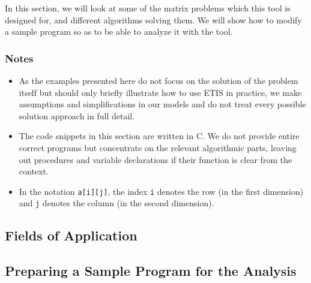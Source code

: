 In this section, we will look at some of the matrix problems which this tool is designed for, and different algorithms solving them. We will show how to modify a sample program so as to be able to analyze it with the tool.

\subsubsection*{Notes}
\begin{itemize}
\item As the examples presented here do not focus on the solution of the problem itself but should only briefly illustrate how to use ETIS in practice, we make assumptions and simplifications in our models and do not treat every possible solution approach in full detail.

\item The code snippets in this section are written in C. We do not provide entire correct programs but concentrate on the relevant algorithmic parts, leaving out procedures and variable declarations if their function is clear from the context.

\item In the notation \texttt{a[i][j]}, the index \texttt{i} denotes the row (in the first dimension) and \texttt{j} denotes the column (in the second dimension).
\end{itemize}


\subsection{Fields of Application}


\subsection{Preparing a Sample Program for the Analysis}


